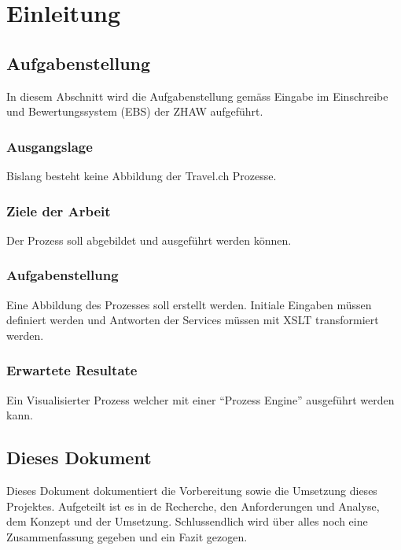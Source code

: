 \chapter{Einleitung}

\section{Aufgabenstellung}
In diesem Abschnitt wird die Aufgabenstellung gemäss Eingabe im Einschreibe und Bewertungssystem (EBS) der ZHAW aufgeführt.

\subsection{Ausgangslage}
Bislang besteht keine Abbildung der Travel.ch Prozesse.

\subsection{Ziele der Arbeit}
\label{sec:desc:targets}
Der Prozess soll abgebildet und ausgeführt werden können.

\subsection{Aufgabenstellung}
Eine Abbildung des Prozesses soll erstellt werden. Initiale Eingaben müssen definiert werden und Antworten der Services müssen mit XSLT transformiert werden.

\subsection{Erwartete Resultate}
Ein Visualisierter Prozess welcher mit einer "`Prozess Engine"' ausgeführt werden kann.

\section{Dieses Dokument}
Dieses Dokument dokumentiert die Vorbereitung sowie die Umsetzung dieses Projektes. 
Aufgeteilt ist es in de Recherche, den Anforderungen und Analyse, dem Konzept und der Umsetzung. Schlussendlich wird über alles noch eine Zusammenfassung gegeben und ein Fazit gezogen.